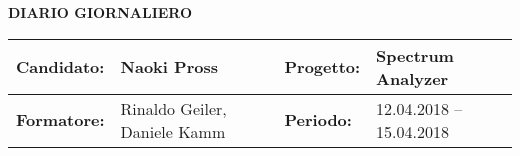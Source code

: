 \documentclass[a4paper]{article}
\newcommand{\name}{Naoki Pross}
\newcommand{\instructor}{Rinaldo Geiler, Daniele Kamm}
\newcommand{\project}{Spectrum Analyzer}
\newcommand{\projstart}{12.04.2018}
\newcommand{\projend}{15.04.2018}
\newcommand{\projperiod}{\projstart{} -- \projend{}}
\begin{document}
    \begin{center}
        \bf \LARGE DIARIO GIORNALIERO
    \end{center}
    
    \vspace{5mm}

    \begin{tabularx}{\textwidth}{| lX | lX |}
        \hline
        \bfseries Candidato: & \name &
        \bfseries Progetto: & \project
        \\\hline
        \bfseries Formatore: & \instructor &
        \bfseries Periodo: & \projperiod
        \\\hline
    \end{tabularx}
   
    \vspace{5mm}
    
\end{document}
